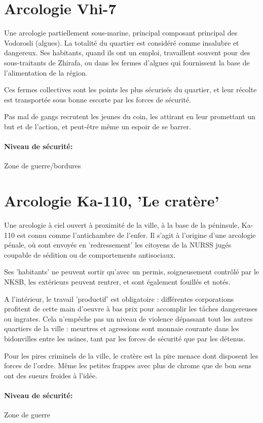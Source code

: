 \documentclass[10pt,a4paper]{book}
\begin{document}
\section{Arcologie Vhi-7}
Une arcologie partiellement sous-marine, principal composant principal des Vodorosli (algues). La totalité du quartier est considéré comme insalubre et dangereux. Ses habitants, quand ils ont un emploi, travaillent souvent pour des sous-traitants de Zhirafa, ou dans les fermes d'algues qui fournissent la base de l'alimentation de la région. 

Ces fermes collectives sont les points les plus sécurisés du quartier, et leur récolte est transportée sous bonne escorte par les forces de sécurité.

Pas mal de gangs recrutent les jeunes du coin, les attirant en leur promettant un but et de l'action, et peut-être même un espoir de se barrer.
\paragraph{Niveau de sécurité:} Zone de guerre/bordures
\section{Arcologie Ka-110, 'Le cratère'}
Une arcologie à ciel ouvert à proximité de la ville, à la base de la péninsule, Ka-110 est connu comme l'antichambre de l'enfer. Il s'agit à l'origine d'une arcologie pénale, où sont envoyés en 'redressement' les citoyens de la NURSS jugés coupable de sédition ou de comportements antisociaux. 

Ses 'habitants' ne peuvent sortir qu'avec un permis, soigneusement contrôlé par le NKSB, les extérieurs peuvent rentrer, et sont également fouillés et notés.

A l'intérieur, le travail 'productif' est obligatoire : différentes corporations profitent de cette main d'oeuvre à bas prix pour accomplir les tâches dangereuses ou ingrates. Cela n'empêche pas un niveau de violence dépassant tout les autres quartiers de la ville : meurtres et agressions sont monnaie courante dans les bidonvilles entre les usines, tant par les forces de sécurité que par les détenus.

Pour les pires criminels de la ville, le cratère est la pire menace dont disposent les forces de l'ordre. Même les petites frappes avec plus de chrome que de bon sens ont des sueurs froides à l'idée.
\paragraph{Niveau de sécurité:}Zone de guerre
\end{document}
